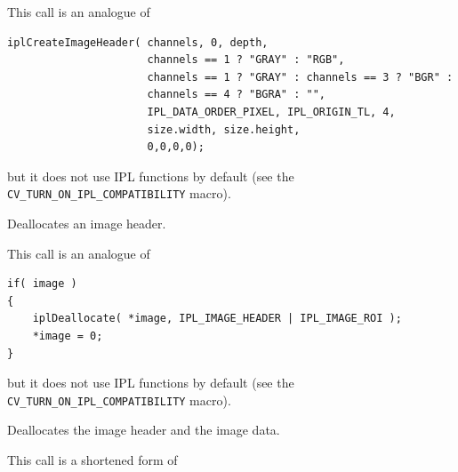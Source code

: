 \begin{description}
\end{description}

This call is an analogue of

\begin{lstlisting}
iplCreateImageHeader( channels, 0, depth,
                      channels == 1 ? "GRAY" : "RGB",
                      channels == 1 ? "GRAY" : channels == 3 ? "BGR" :
                      channels == 4 ? "BGRA" : "",
                      IPL_DATA_ORDER_PIXEL, IPL_ORIGIN_TL, 4,
                      size.width, size.height,
                      0,0,0,0);
\end{lstlisting}

but it does not use IPL functions by default (see the \texttt{CV\_TURN\_ON\_IPL\_COMPATIBILITY} macro).

\label{ReleaseImageHeader}

Deallocates an image header.


\begin{description}
\end{description}

This call is an analogue of

\begin{lstlisting}
if( image )
{
    iplDeallocate( *image, IPL_IMAGE_HEADER | IPL_IMAGE_ROI );
    *image = 0;
}
\end{lstlisting}

but it does not use IPL functions by default (see the \texttt{CV\_TURN\_ON\_IPL\_COMPATIBILITY} macro).


\label{ReleaseImage}

Deallocates the image header and the image data.


\begin{description}
\end{description}

This call is a shortened form of

